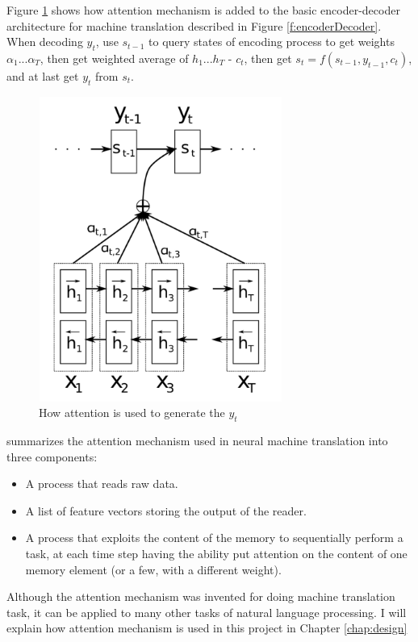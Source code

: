 \documentclass[modernstyle,12pt]{sjsuthesis}
\theoremstyle{definition}
\begin{document}
Figure \ref{f:attention} shows how attention mechanism is added to the basic encoder-decoder architecture for machine translation described in Figure \ref{f:encoderDecoder}. When decoding $y_t$, use $s_{t-1}$ to query states of encoding process to get weights $\alpha _1 ... \alpha _T$, then get weighted average of $h_1 ... h_T$ - $c_t$, then get $s_t =f(s_{t-1},y_{t-1},c_t)$, and at last get $y_t$ from $s_t$.

\begin{figure}[htbp]\centering
  \includegraphics[width=8cm, height=10cm]{figures/attention}
  \caption{How attention is used to generate the $y_t$ \cite{bahdanau2014neural}}
  \label{f:attention}
\end{figure}

\cite{goodfellow2016deep} summarizes the attention mechanism used in neural machine translation into three components:
\begin{itemize}
\item{A process that reads raw data.}
\item{A list of feature vectors storing the output of the reader.}
\item{A process that exploits the content of the memory to sequentially perform a task, at each time step having the ability put attention on the content of one memory element (or a few, with a different weight).}
\end{itemize}



Although the attention mechanism was invented for doing machine translation task, it can be applied to many other tasks of natural language processing. I will explain how attention mechanism is used in this project in Chapter \ref{chap:design}
\end{document}
